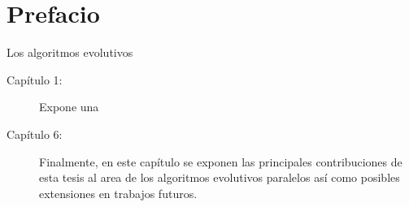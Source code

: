 % 



\chapter* {Prefacio}

Los algoritmos evolutivos 



\begin{description}
\item[Cap\'itulo 1:] Expone una 
\item[Cap\'itulo 6:] Finalmente, en este cap\'itulo se exponen las principales contribuciones de esta tesis al area de los algoritmos evolutivos paralelos as\'i como posibles extensiones en trabajos futuros.

\end{description}






\clearpage

% 